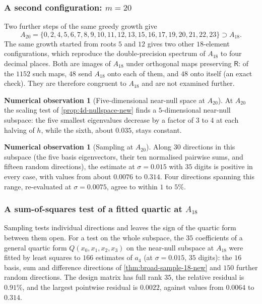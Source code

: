 \documentclass[11pt,reqno]{amsart}
\renewcommand{\_}{\origunderscore\allowbreak}
\numberwithin{equation}{section}
\theoremstyle{plain}
\theoremstyle{definition}
\newtheorem{numobs}[thm]{Numerical observation}
\theoremstyle{remark}
\newcommand{\Rt}{\mathsf{R}}                 %
\begin{document}
\subsubsection{A second configuration: \texorpdfstring{$m=20$}{m=20}}

Two further steps of the same greedy growth give
\[
  A_{20} = \{0,2,4,5,6,7,8,9,10,11,12,13,15,16,17,19,20,21,22,23\}
  \supset A_{18}.
\]
The same growth started from roots $5$ and $12$ gives two other
$18$-element configurations, which reproduce the double-precision
spectrum of $A_{18}$ to four decimal places. Both are images of
$A_{18}$ under orthogonal maps preserving $\Rt$: of the $1152$ such
maps, $48$ send $A_{18}$ onto each of them, and $48$ onto itself (an
exact check). They are therefore congruent to $A_{18}$ and are not
examined further.

\begin{numobs}[Five-dimensional near-null space at $A_{20}$]\label{prop:5d-nullspace-new}
At $A_{20}$ the scaling test of \cref{prop:4d-nullspace-new} finds a
$5$-dimensional near-null subspace: the five smallest eigenvalues
decrease by a factor of $3$ to $4$ at each halving of $h$, while the
sixth, about $0.035$, stays constant.
\end{numobs}

\begin{numobs}[Sampling at $A_{20}$]\label{thm:broad-sample-20-new}
Along $30$ directions in this subspace (the five basis eigenvectors,
their ten normalised pairwise sums, and fifteen random directions), the
estimate at $\sigma=0.015$ with $35$ digits is positive in every case,
with values from about $0.0076$ to $0.314$. Four directions spanning
this range, re-evaluated at $\sigma=0.0075$, agree to within $1$ to
$5\%$.
\end{numobs}

\subsubsection{A sum-of-squares test of a fitted quartic at \texorpdfstring{$A_{18}$}{A18}}\label{sec:gram-sos-A18}

Sampling tests individual directions and leaves the sign of the
quartic form between them open. For a test on the whole subspace, the
$35$ coefficients of a general quartic form $Q(x_0,x_1,x_2,x_3)$ on the
near-null subspace at $A_{18}$ were fitted by least squares to $166$
estimates of $a_4$ (at $\sigma=0.015$, $35$ digits): the $16$ basis,
sum and difference directions of \cref{thm:broad-sample-18-new} and
$150$ further random directions. The design matrix has full rank $35$,
the relative residual is $0.91\%$, and the largest pointwise residual is
$0.0022$, against values from $0.0064$ to $0.314$.
\end{document}
